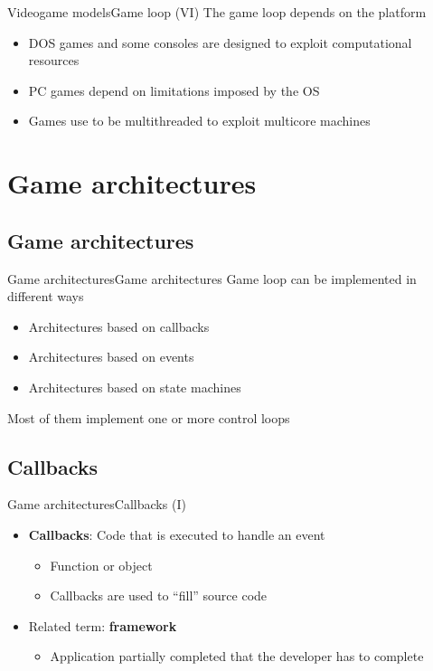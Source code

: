 \documentclass[10pt,compress]{beamer} %
\begin{document}
\begin{frame}{Videogame models}{Game loop (VI)}
	    The game loop depends on the platform
		\begin{itemize}
			\item DOS games and some consoles are designed to exploit computational resources
			\item PC games depend on limitations imposed by the OS
			\item Games use to be multithreaded to exploit multicore machines
		\end{itemize}
\end{frame}

\section{Game architectures}
\subsection{Game architectures}

\begin{frame}{Game architectures}{Game architectures}
    Game loop can be implemented in different ways
	\begin{itemize}
		\item Architectures based on callbacks
		\item Architectures based on events
		\item Architectures based on state machines
	\end{itemize}
	Most of them implement one or more control loops
\end{frame}

\subsection{Callbacks}
\begin{frame}{Game architectures}{Callbacks (I)}
	\begin{itemize}
		\item \textbf{Callbacks}: Code that is executed to handle an event
		\begin{itemize}
			\item Function or object
			\item Callbacks are used to ``fill'' source code
		\end{itemize}
		\item Related term: \textbf{framework}
		\begin{itemize}
			\item Application partially completed that the developer has to complete
		\end{itemize}
	\end{itemize}
\end{frame}
\end{document}
